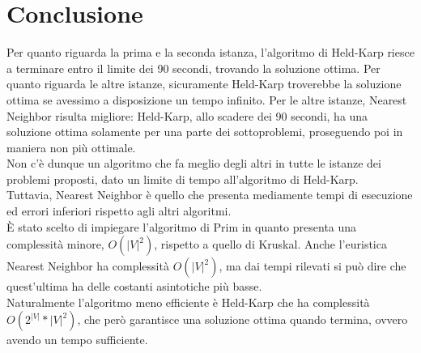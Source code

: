 \section{Conclusione}


Per quanto riguarda la prima e la seconda istanza, l'algoritmo di Held-Karp riesce a terminare entro il limite dei 90 secondi, trovando la soluzione ottima. 
Per quanto riguarda le altre istanze, sicuramente Held-Karp troverebbe la soluzione ottima se avessimo a disposizione un tempo infinito. 
Per le altre istanze, Nearest Neighbor risulta migliore: Held-Karp, allo scadere dei 90 secondi, ha una soluzione ottima solamente per una parte dei sottoproblemi, proseguendo poi in maniera non più ottimale. \\
Non c'è dunque un algoritmo che fa meglio degli altri in tutte le istanze dei problemi proposti, dato un limite di tempo all'algoritmo di Held-Karp.\\
Tuttavia, Nearest Neighbor è quello che presenta mediamente tempi di esecuzione ed errori inferiori rispetto agli altri algoritmi.\\
\`E stato scelto di impiegare l'algoritmo di Prim in quanto presenta una complessità minore, $O(|V|^2)$, rispetto a quello di Kruskal.
Anche l'euristica Nearest Neighbor ha complessità $O(|V|^2)$, ma dai tempi rilevati si può dire che quest'ultima ha delle costanti asintotiche più basse.\\
Naturalmente l'algoritmo meno efficiente è Held-Karp che ha complessità $O(2^{|V|}*|V|^2)$, che però garantisce una soluzione ottima quando termina, ovvero avendo un tempo sufficiente.

\pagebreak
